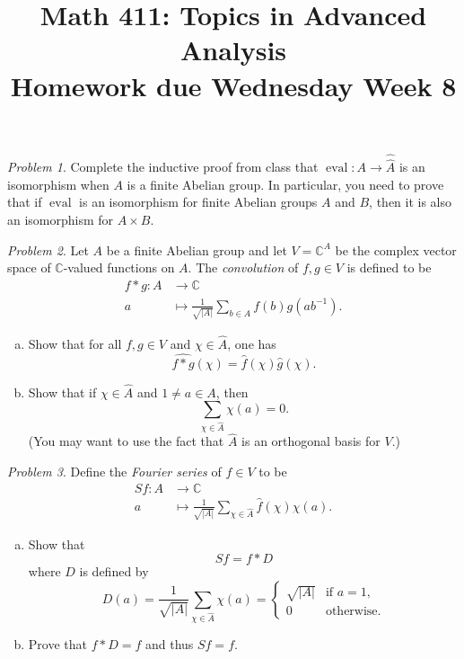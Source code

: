 \documentclass[11pt,twoside]{amsart}
\title{Math 411: Topics in Advanced Analysis\\ Homework due Wednesday Week 8}
\theoremstyle{plain}
\theoremstyle{remark}
\newtheorem{prob}{Problem}
\theoremstyle{definition}
\theoremstyle{definition}
\newcommand{\CC}{\mathbb{C}}
\newcommand{\eval}{\operatorname{eval}}
\begin{document}
\maketitle

\begin{prob}
Complete the inductive proof from class that $\eval\colon A\to \hat{\hat A}$ is an isomorphism when $A$ is a finite Abelian group. In particular, you need to prove that if $\eval$ is an isomorphism for finite Abelian groups $A$ and $B$, then it is also an isomorphism for $A\times B$.
\end{prob}

\begin{prob}
Let $A$ be a finite Abelian group and let $V = \CC^A$ be the complex vector space of $\CC$-valued functions on $A$. The \emph{convolution} of $f,g\in V$ is defined to be
\[
\begin{aligned}
  f*g\colon A&\longrightarrow \CC\\
  a&\longmapsto \frac{1}{\sqrt{|A|}}\sum_{b\in A}f(b)g(ab^{-1}).
\end{aligned}
\]
\begin{enumerate}[(a)]
\item Show that for all $f,g\in V$ and $\chi\in \hat A$, one has
\[
  \widehat{f*g}(\chi) = \hat f(\chi)\hat g(\chi).
\]
\item Show that if $\chi\in\hat A$ and $1\ne a\in A$, then
\[
  \sum_{\chi\in \hat A}\chi(a) = 0.
\]
(You may want to use the fact that $\hat A$ is an orthogonal basis for $V$.)
\end{enumerate}
\end{prob}

\begin{prob}
Define the \emph{Fourier series} of $f\in V$ to be
\[
\begin{aligned}
  Sf\colon A&\longrightarrow \CC\\
  a&\longmapsto \frac{1}{\sqrt{|A|}}\sum_{\chi\in \hat A}\hat f(\chi)\chi(a).
\end{aligned}
\]
\begin{enumerate}[(a)]
\item Show that
\[
  Sf = f*D
\]
where $D$ is defined by
\[
  D(a) = \frac{1}{\sqrt{|A|}}\sum_{\chi\in \hat A} \chi(a) =
  \begin{cases}
  \sqrt{|A|}&\text{if }a=1,\\
  0&\text{otherwise}.
  \end{cases}
\]
\item Prove that $f*D = f$ and thus $Sf=f$.
\end{enumerate}
\end{prob}
\end{document}
